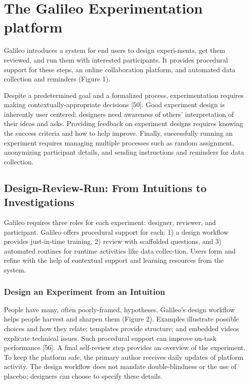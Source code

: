 \section{The Galileo Experimentation platform}
Galileo introduces a system for end users to design experi-ments, get them reviewed, and run them with interested participants. It provides procedural support for these steps, an online collaboration platform, and automated data collection and reminders (Figure 1).

Despite a predetermined goal and a formalized process, experimentation requires making contextually-appropriate decisions [50]. Good experiment design is inherently user centered; designers need awareness of others’ interpretation of their ideas and asks. Providing feedback on experiment designs requires knowing the success criteria and how to help improve. Finally, successfully running an experiment requires managing multiple processes such as random assignment, anonymizing participant details, and sending instructions and reminders for data collection.

\subsection{Design-Review-Run: From Intuitions to Investigations}
Galileo requires three roles for each experiment: designer, reviewer, and participant. Galileo offers procedural support for each: 1) a design workflow provides just-in-time training, 2) review with scaffolded questions, and 3) automated routines for runtime activities like data collec-tion. Users form and refine with the help of contextual support and learning resources from the system. 

\subsubsection{Design an Experiment from an Intuition}
People have many, often poorly-framed, hypotheses. Galileo’s design workflow helps people harvest and sharpen them (Figure 2). Examples illustrate possible choices and how they relate; templates provide structure; and embedded videos explicate technical issues. Such procedural support can improve on-task performance [56]. A final self-review step provides an overview of the experiment. To keep the platform safe, the primary author receives daily updates of platform activity. The design workflow does not mandate double-blindness or the use of placebo; designers can choose to specify these details.

